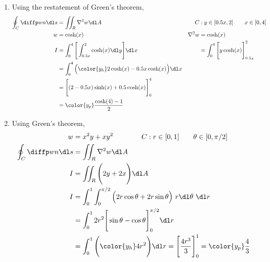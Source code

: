 \begin{enumerate}
    \item Using the restatement of Green's theorem,
          \begin{align}
              \oint_C \diffp wn \dl s     & = \iint_R \nabla^2 w \dl A            &
              C                           & : y \in [0.5x, 2] \qquad x \in [0, 4]   \\
              w                           & = \cosh(x)                            &
              \nabla^2 w                  & = \cosh(x)                              \\
              I                           & = \int_{0}^{4} \Bigg[ \int_{0.5x}^{2}
              \cosh(x) \dl y \Bigg] \dl x &
                                          & = \int_{0}^{4} \Bigg[ y\cosh(x)
              \Bigg]_{0.5x}^2                                                       \\
                                          & = \int_{0}^{4} \Big({\color{y_h}
                  2\cosh(x) - 0.5x\cosh(x)}\Big)
              \dl x                                                                 \\
                                          & = \Bigg[ (2 - 0.5x)\sinh(x)
              + 0.5\cosh(x) \Bigg]_0^4                                              \\
                                          & = \color{y_p} \frac{\cosh(4) - 1}{2}
          \end{align}

    \item Using Green's theorem,
          \begin{align}
              w                       & = x^2y + xy^2 \qquad \qquad
              C : r \in [0, 1] \qquad \theta \in [0, \pi/2]                   \\
              \oint_C \diffp wn \dl s & = \iint_R \nabla^2 w \dl A            \\
              I                       & = \iint_R \Bigg( 2y + 2x \Bigg) \dl A \\
              I                       & = \int_{0}^{1} \int_{0}^{\pi/2}
              \Big( 2r \cos \theta + 2r \sin \theta \Big)
              \ r \dl \theta\ \dl r                                           \\
                                      & =  \int_{0}^{1} 2r^2 \Bigg[
              \sin \theta - \cos \theta \Bigg]_{0}^{\pi/2} \dl r              \\
                                      & = \int_{0}^{1} \Bigg({\color{y_h}
                  4r^2 } \Bigg) \dl r
              = \Bigg[ \frac{4r^3}{3} \Bigg]_{0}^{1}
              = \color{y_p} \frac{4}{3}
          \end{align}


\end{enumerate}
